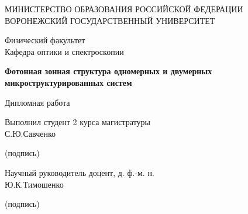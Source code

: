%
%
\begin{titlepage}

\thispagestyle{empty} %
\begin{center}
{\large МИНИСТЕРСТВО ОБРАЗОВАНИЯ РОССИЙСКОЙ ФЕДЕРАЦИИ\/}\\


{\large ВОРОНЕЖСКИЙ ГОСУДАРСТВЕННЫЙ УНИВЕРСИТЕТ\/}
\end{center}

\vspace{1mm}

\begin{center}
{\Large Физический факультет \/}\\ \vspace{1mm} {\Large Кафедра
оптики и спектроскопии\/}
\end{center}

\vspace{25mm}

\begin{center}
{\LARGE \bf Фотонная зонная структура одномерных и двумерных микроструктурированных систем}
\end{center}

\vspace{6mm}

\begin{center}
{\LARGE Дипломная работа\/}
\end{center}

\vspace{5mm}

\begin{flushright}
Выполнил студент 2 курса магистратуры \phantom{}\\

С.Ю.Савченко \underline{\hspace{59mm}}

{\vspace{-4mm} \footnotesize (подпись)\/}


Научный руководитель доцент, д. ф.-м. н.\\

Ю.К.Тимошенко \underline{\hspace{54mm}}

{\vspace{-4mm} \footnotesize(подпись)\/}


\end{flushright}
\end{titlepage}

